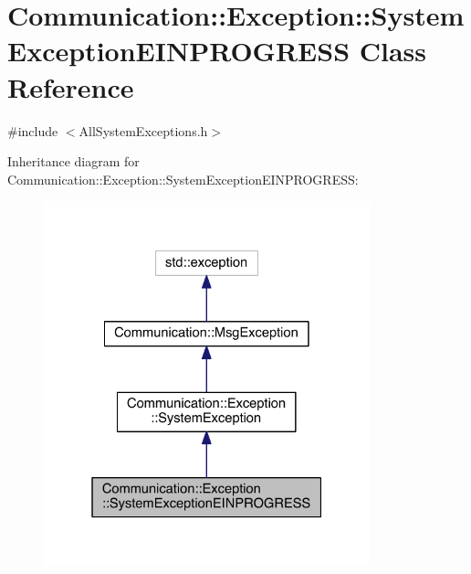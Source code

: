 \hypertarget{class_communication_1_1_exception_1_1_system_exception_e_i_n_p_r_o_g_r_e_s_s}{}\section{Communication\+:\+:Exception\+:\+:System\+Exception\+E\+I\+N\+P\+R\+O\+G\+R\+E\+S\+S Class Reference}
\label{class_communication_1_1_exception_1_1_system_exception_e_i_n_p_r_o_g_r_e_s_s}


{\ttfamily \#include $<$All\+System\+Exceptions.\+h$>$}



Inheritance diagram for Communication\+:\+:Exception\+:\+:System\+Exception\+E\+I\+N\+P\+R\+O\+G\+R\+E\+S\+S\+:\nopagebreak
\begin{figure}[H]
\begin{center}
\leavevmode
\includegraphics[width=268pt]{class_communication_1_1_exception_1_1_system_exception_e_i_n_p_r_o_g_r_e_s_s__inherit__graph}
\end{center}
\end{figure}


